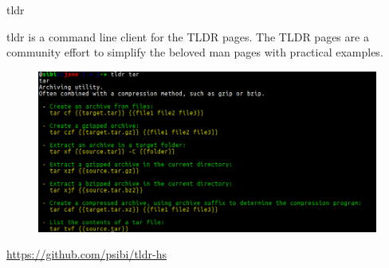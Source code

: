 \documentclass[DIV16,twocolumn,10pt]{scrreprt}
\begin{document}
\begin{hcarentry}{tldr}
\makeheader

tldr is a command line client for the TLDR pages. The TLDR pages are a
community effort to simplify the beloved man pages with practical
examples.

\begin{figure}[h!]
  \includegraphics[width=\linewidth]{tldr.png}
  \label{fig:tldr-client}
\end{figure}

\FurtherReading
  \url{https://github.com/psibi/tldr-hs}
\end{hcarentry}
\end{document}
